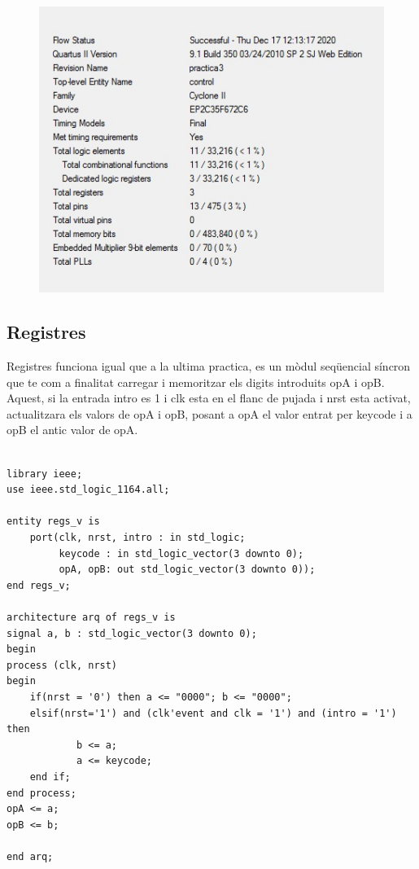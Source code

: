 \documentclass[12pt, a4papre]{article}
\begin{document}
	\begin{figure}[H]
		\begin{center}
		\includegraphics[width=130mm]{informeControl.jpeg}
		\end{center}
	\end{figure}	
		
		
\subsection{Registres}

	Registres funciona igual que a la ultima practica, es un mòdul seqüencial síncron que te com a finalitat carregar i memoritzar els digits introduits opA i opB. Aquest, si la entrada intro es 1 i clk esta en el flanc de pujada i nrst esta activat, actualitzara els valors de opA i opB, posant a opA el valor entrat per keycode i a opB el antic valor de opA.
	
		\begin{lstlisting}[style=vhdl, frame=single, basicstyle=\tiny]

library ieee;
use ieee.std_logic_1164.all;

entity regs_v is
	port(clk, nrst, intro : in std_logic;
		 keycode : in std_logic_vector(3 downto 0);
		 opA, opB: out std_logic_vector(3 downto 0));
end regs_v;

architecture arq of regs_v is
signal a, b : std_logic_vector(3 downto 0);
begin
process (clk, nrst)
begin 
	if(nrst = '0') then a <= "0000"; b <= "0000";
	elsif(nrst='1') and (clk'event and clk = '1') and (intro = '1') then
			b <= a;
			a <= keycode;
	end if;
end process;
opA <= a;
opB <= b;

end arq;

		\end{lstlisting}
		
\end{document}
